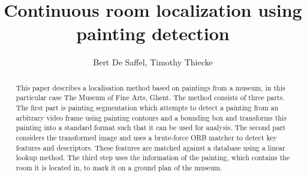 \documentclass[10pt,final,journal]{IEEEtran}
\title{Continuous room localization using painting detection}
\author{Bert De Saffel, Timothy Thiecke}
\begin{document}
	\maketitle
	\begin{abstract}
		This paper describes a localisation method based on paintings from a museum, in this particular case The Museum of Fine Arts, Ghent. The method consists of three parts. The first part is painting segmentation which attempts to detect a painting from an arbitrary video frame using painting contours and a bounding box and transforms this painting into a standard format such that it can be used for analysis. The second part considers the transformed image and uses a brute-force ORB \cite{Rublee2011} matcher to detect key features and descriptors. These features are matched against a database using a linear lookup method. The third step uses the information of the painting, which contains the room it is located in, to mark it on a ground plan of the museum.

	\end{abstract}

	
	
	
	
	
	

	
	
\end{document}
